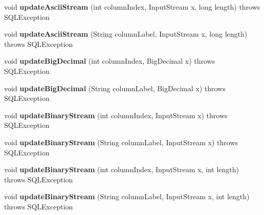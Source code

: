 \begin{DoxyCompactItemize}
void {\bfseries update\+Ascii\+Stream} (int column\+Index, Input\+Stream x, long length)  throws S\+Q\+L\+Exception 
\item 
\mbox{\label{classsimpledb_1_1jdbc_1_1ResultSetAdapter_af264ae70d338581039009199db5b337d}} 
void {\bfseries update\+Ascii\+Stream} (String column\+Label, Input\+Stream x, long length)  throws S\+Q\+L\+Exception 
\item 
\mbox{\label{classsimpledb_1_1jdbc_1_1ResultSetAdapter_ac65582fbb116ae488cad6ea929e77e2e}} 
void {\bfseries update\+Big\+Decimal} (int column\+Index, Big\+Decimal x)  throws S\+Q\+L\+Exception 
\item 
\mbox{\label{classsimpledb_1_1jdbc_1_1ResultSetAdapter_a611d9d9f9379ff085cc32876d8a42440}} 
void {\bfseries update\+Big\+Decimal} (String column\+Label, Big\+Decimal x)  throws S\+Q\+L\+Exception 
\item 
\mbox{\label{classsimpledb_1_1jdbc_1_1ResultSetAdapter_a7d3c64f3b2a6b4913620725280d641be}} 
void {\bfseries update\+Binary\+Stream} (int column\+Index, Input\+Stream x)  throws S\+Q\+L\+Exception 
\item 
\mbox{\label{classsimpledb_1_1jdbc_1_1ResultSetAdapter_a23ae6451dd3e44e922fe40dcaee9cd4a}} 
void {\bfseries update\+Binary\+Stream} (String column\+Label, Input\+Stream x)  throws S\+Q\+L\+Exception 
\item 
\mbox{\label{classsimpledb_1_1jdbc_1_1ResultSetAdapter_a9a628d90e75eb2e0ef02b3fda21c5b1d}} 
void {\bfseries update\+Binary\+Stream} (int column\+Index, Input\+Stream x, int length)  throws S\+Q\+L\+Exception 
\item 
\mbox{\label{classsimpledb_1_1jdbc_1_1ResultSetAdapter_a0074f258030b012967584d96cc55aae0}} 
void {\bfseries update\+Binary\+Stream} (String column\+Label, Input\+Stream x, int length)  throws S\+Q\+L\+Exception 
\item 
\mbox{\label{classsimpledb_1_1jdbc_1_1ResultSetAdapter_a2002f555859a1cf552e60978bfe96760}} 

\end{DoxyCompactItemize}
